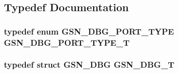 \subsection{Typedef Documentation}
\hypertarget{a00480_a42632950cffc518e7b58d4661584b8a9}{
\subsubsection[{GSN\_\-DBG\_\-PORT\_\-TYPE\_\-T}]{\setlength{\rightskip}{0pt plus 5cm}typedef enum {\bf GSN\_\-DBG\_\-PORT\_\-TYPE}  {\bf GSN\_\-DBG\_\-PORT\_\-TYPE\_\-T}}}
\label{a00480_a42632950cffc518e7b58d4661584b8a9}
\hypertarget{a00480_a4920ef5c327fa0df103c11fe6abd0ca4}{
\subsubsection[{GSN\_\-DBG\_\-T}]{\setlength{\rightskip}{0pt plus 5cm}typedef struct {\bf GSN\_\-DBG}  {\bf GSN\_\-DBG\_\-T}}}
\label{a00480_a4920ef5c327fa0df103c11fe6abd0ca4}


